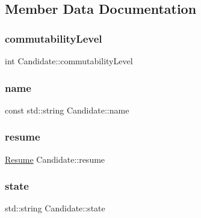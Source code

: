 \subsection{Member Data Documentation}
\hypertarget{class_candidate_a143f4a4644276e9a1914e12c4be8b986}{}\label{class_candidate_a143f4a4644276e9a1914e12c4be8b986} 
\subsubsection{\texorpdfstring{commutability\+Level}{commutabilityLevel}}
{\footnotesize\ttfamily int Candidate\+::commutability\+Level\hspace{0.3cm}{\ttfamily [private]}}

\hypertarget{class_candidate_ab3c913ca21b7c5239b48e551483bb808}{}\label{class_candidate_ab3c913ca21b7c5239b48e551483bb808} 
\subsubsection{\texorpdfstring{name}{name}}
{\footnotesize\ttfamily const std\+::string Candidate\+::name\hspace{0.3cm}{\ttfamily [private]}}

\hypertarget{class_candidate_aa377897c9a9bdf566f7f1074f37d9ff1}{}\label{class_candidate_aa377897c9a9bdf566f7f1074f37d9ff1} 
\subsubsection{\texorpdfstring{resume}{resume}}
{\footnotesize\ttfamily \hyperlink{class_resume}{Resume} Candidate\+::resume}

\hypertarget{class_candidate_a521dc0a66f6b111e5c70d64f6ecfbca5}{}\label{class_candidate_a521dc0a66f6b111e5c70d64f6ecfbca5} 
\subsubsection{\texorpdfstring{state}{state}}
{\footnotesize\ttfamily std\+::string Candidate\+::state\hspace{0.3cm}{\ttfamily [private]}}

